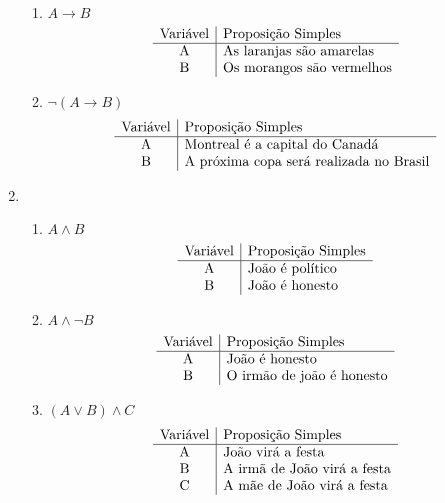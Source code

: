 \begin{enumerate}
\begin{enumerate}
			\item $ A \to B $
			\[\begin{array}{c|l} 
			\text{Vari\'avel} & \text{Proposi\c{c}\~ao Simples} \\ \hline
			$A$        & \text{As laranjas s\~ao amarelas}\\ 
			$B$        & \text{Os morangos s\~ao vermelhos}\\
			\end{array}
			\]			
						
			\item $ \neg ( A \to B) $
			\[\begin{array}{c|l} 
			\text{Vari\'avel} & \text{Proposi\c{c}\~ao Simples} \\ \hline
			$A$        & \text{Montreal \'e a capital do Canad\'a}\\ 
			$B$        & \text{A pr\'oxima copa ser\'a realizada no Brasil}\\
			\end{array}
			\]
	
			\end{enumerate}
	

	
			\item
				\begin{enumerate}
				
				\item $ A \land B $
				\[\begin{array}{c|l} 
				\text{Vari\'avel} & \text{Proposi\c{c}\~ao Simples} \\ \hline
				$A$        & \text{Jo\~ao \'e pol\'itico}\\ 
				$B$        & \text{Jo\~ao \'e honesto}\\
				\end{array}
				\]
					
				\item $ A \land \neg B $
				\[\begin{array}{c|l} 
				\text{Vari\'avel} & \text{Proposi\c{c}\~ao Simples} \\ \hline
				$A$        & \text{Jo\~ao \'e honesto}\\ 
				$B$        & \text{O irm\~ao de jo\~ao \'e honesto}\\
				\end{array}
				\]

				\item $ (A \lor B ) \land C $
				\[\begin{array}{c|l} 
				\text{Vari\'avel} & \text{Proposi\c{c}\~ao Simples} \\ \hline
				$A$        & \text{Jo\~ao vir\'a a festa}\\ 
				$B$        & \text{A irm\~a de Jo\~ao vir\'a a festa}\\
				$C$ 	   & \text{A m\~ae de Jo\~ao vir\'a a festa} \\
				\end{array}
				\]
				

\end{enumerate}
\end{enumerate}

